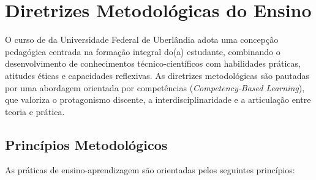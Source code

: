 \chapter{Diretrizes Metodológicas do Ensino}

O curso de \ppccurso da Universidade Federal de Uberlândia adota uma concepção pedagógica centrada na formação integral do(a) estudante, combinando o desenvolvimento de conhecimentos técnico-científicos com habilidades práticas, atitudes éticas e capacidades reflexivas. As diretrizes metodológicas são pautadas por uma abordagem orientada por competências (\textit{Competency-Based Learning}), que valoriza o protagonismo discente, a interdisciplinaridade e a articulação entre teoria e prática.

\section{Princípios Metodológicos}

As práticas de ensino-aprendizagem são orientadas pelos seguintes princípios:

